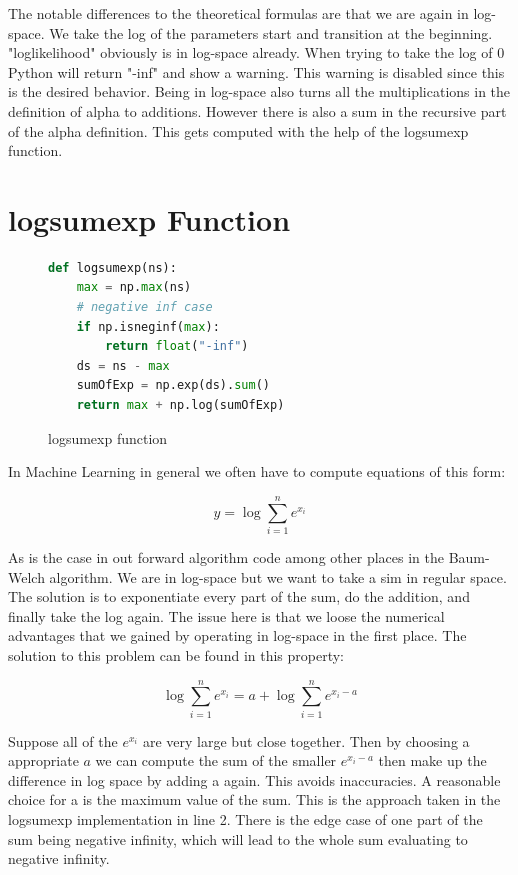 The notable differences to the theoretical formulas are that we are again in log-space. We take the log of the parameters start and transition at the beginning. "loglikelihood" obviously is in log-space already. When trying to take the log of 0 Python will return "-inf" and show a warning. This warning is disabled since this is the desired behavior. Being in log-space also turns all the multiplications in the definition of alpha to additions. However there is also a sum in the recursive part of the alpha definition. This gets computed with the help of the logsumexp function. 

\section{logsumexp Function}

\begin{figure}
\begin{singlespace}
\begin{lstlisting}[language=Python]
def logsumexp(ns):
    max = np.max(ns)
    # negative inf case
    if np.isneginf(max):
        return float("-inf")
    ds = ns - max
    sumOfExp = np.exp(ds).sum()
    return max + np.log(sumOfExp)

\end{lstlisting}
\end{singlespace}
\caption{logsumexp function}    
\label{fig:logsumexp-listing}
\end{figure}

In Machine Learning in general we often have to compute equations of this form: 

\begin{equation}
y=\log \sum_{i=1}^{n} e^{x_{i}}
\end{equation}

As is the case in out forward algorithm code among other places in the Baum-Welch algorithm. We are in log-space but we want to take a sim in regular space. The solution is to exponentiate every part of the sum, do the addition, and finally take the log again. The issue here is that we loose the numerical advantages that we gained by operating in log-space in the first place. The solution to this problem can be found in this property:

\begin{equation}
\log \sum_{i=1}^{n} e^{x_{i}}=a+\log \sum_{i=1}^{n} e^{x_{i}-a}
\end{equation}

Suppose all of the $e^{x_i}$ are very large but close together. Then by choosing a appropriate $a$ we can compute the sum of the smaller $e^{x_i-a}$ then make up the difference in log space by adding a again. This avoids inaccuracies. A reasonable choice for a is the maximum value of the sum. This is the approach taken in the logsumexp implementation in line 2. There is the edge case of one part of the sum being negative infinity, which will lead to the whole sum evaluating to negative infinity. 

